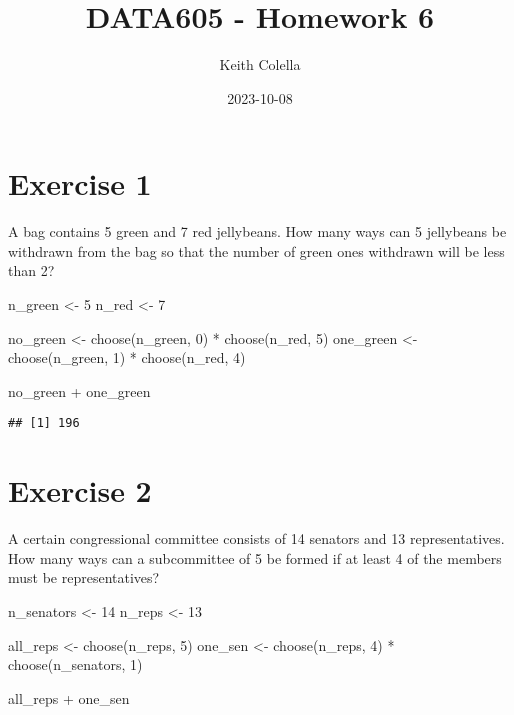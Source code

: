 \documentclass[
]{article}
\title{DATA605 - Homework 6}
\author{Keith Colella}
\date{2023-10-08}
\newenvironment{Shaded}{\begin{snugshade}}{\end{snugshade}}
\newcommand{\DecValTok}[1]{\textcolor[rgb]{0.00,0.00,0.81}{#1}}
\newcommand{\FunctionTok}[1]{\textcolor[rgb]{0.00,0.00,0.00}{#1}}
\newcommand{\NormalTok}[1]{#1}
\newcommand{\OtherTok}[1]{\textcolor[rgb]{0.56,0.35,0.01}{#1}}
\newcommand{\SpecialCharTok}[1]{\textcolor[rgb]{0.00,0.00,0.00}{#1}}
\begin{document}
\maketitle

\hypertarget{exercise-1}{%
\section{Exercise 1}\label{exercise-1}}

A bag contains 5 green and 7 red jellybeans. How many ways can 5
jellybeans be withdrawn from the bag so that the number of green ones
withdrawn will be less than 2?

\begin{Shaded}
\begin{Highlighting}[]
\NormalTok{n\_green }\OtherTok{\textless{}{-}} \DecValTok{5}
\NormalTok{n\_red }\OtherTok{\textless{}{-}} \DecValTok{7}

\NormalTok{no\_green }\OtherTok{\textless{}{-}} \FunctionTok{choose}\NormalTok{(n\_green, }\DecValTok{0}\NormalTok{) }\SpecialCharTok{*} \FunctionTok{choose}\NormalTok{(n\_red, }\DecValTok{5}\NormalTok{)}
\NormalTok{one\_green }\OtherTok{\textless{}{-}} \FunctionTok{choose}\NormalTok{(n\_green, }\DecValTok{1}\NormalTok{) }\SpecialCharTok{*} \FunctionTok{choose}\NormalTok{(n\_red, }\DecValTok{4}\NormalTok{)}

\NormalTok{no\_green }\SpecialCharTok{+}\NormalTok{ one\_green}
\end{Highlighting}
\end{Shaded}

\begin{verbatim}
## [1] 196
\end{verbatim}

\hypertarget{exercise-2}{%
\section{Exercise 2}\label{exercise-2}}

A certain congressional committee consists of 14 senators and 13
representatives. How many ways can a subcommittee of 5 be formed if at
least 4 of the members must be representatives?

\begin{Shaded}
\begin{Highlighting}[]
\NormalTok{n\_senators }\OtherTok{\textless{}{-}} \DecValTok{14}
\NormalTok{n\_reps }\OtherTok{\textless{}{-}} \DecValTok{13}

\NormalTok{all\_reps }\OtherTok{\textless{}{-}} \FunctionTok{choose}\NormalTok{(n\_reps, }\DecValTok{5}\NormalTok{)}
\NormalTok{one\_sen }\OtherTok{\textless{}{-}} \FunctionTok{choose}\NormalTok{(n\_reps, }\DecValTok{4}\NormalTok{) }\SpecialCharTok{*} \FunctionTok{choose}\NormalTok{(n\_senators, }\DecValTok{1}\NormalTok{)}

\NormalTok{all\_reps }\SpecialCharTok{+}\NormalTok{ one\_sen}
\end{Highlighting}
\end{Shaded}
\end{document}
